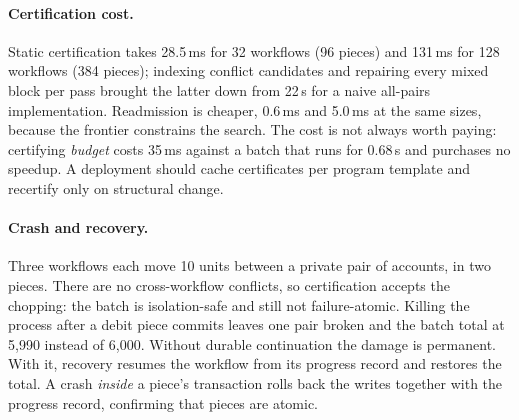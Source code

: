 \paragraph{Certification cost.}
Static certification takes 28.5\,ms for 32 workflows (96 pieces) and 131\,ms
for 128 workflows (384 pieces); indexing conflict candidates and repairing
every mixed block per pass brought the latter down from 22\,s for a naive
all-pairs implementation. Readmission is cheaper, 0.6\,ms and 5.0\,ms at the
same sizes, because the frontier constrains the search. The cost is not
always worth paying: certifying \emph{budget} costs 35\,ms against a batch
that runs for 0.68\,s and purchases no speedup. A deployment should cache
certificates per program template and recertify only on structural change.

\paragraph{Crash and recovery.}
Three workflows each move 10 units between a private pair of accounts, in two
pieces. There are no cross-workflow conflicts, so certification accepts the
chopping: the batch is isolation-safe and still not failure-atomic. Killing
the process after a debit piece commits leaves one pair broken and the batch
total at 5{,}990 instead of 6{,}000. Without durable continuation the damage
is permanent. With it, recovery resumes the workflow from its progress record
and restores the total. A crash \emph{inside} a piece's transaction rolls back
the writes together with the progress record, confirming that pieces are
atomic.
